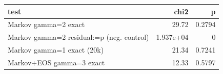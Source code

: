 \begin{table}
\label{tab:task3_sampler_checks}
\begin{tabular}{lrr}
\toprule
test & chi2 & p \\
\midrule
Markov gamma=2 exact & 29.72 & 0.2794 \\
Markov gamma=2 residual:=p (neg. control) & 1.937e+04 & 0 \\
Markov gamma=1 exact (20k) & 21.34 & 0.7241 \\
Markov+EOS gamma=3 exact & 12.33 & 0.5797 \\
\bottomrule
\end{tabular}
\end{table}

